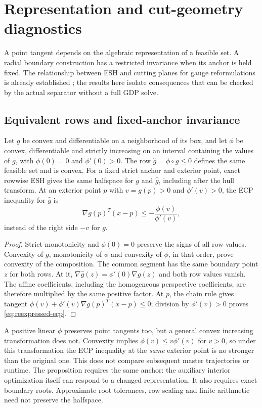\section{Representation and cut-geometry diagnostics}\label{sec:oracle}
A point tangent depends on the algebraic representation of a feasible set. A radial boundary construction has a restricted invariance when its anchor is held fixed. The relationship between ESH and cutting planes for gauge reformulations is already established \citep{serrano2020}; the results here isolate consequences that can be checked by the actual separator without a full GDP solve.

\subsection{Equivalent rows and fixed-anchor invariance}
\begin{proposition}\label{prop:invariance}
Let $g$ be convex and differentiable on a neighborhood of its box, and let $\phi$ be convex, differentiable and strictly increasing on an interval containing the values of $g$, with $\phi(0)=0$ and $\phi'(0)>0$. The row $\widehat g=\phi\circ g\le0$ defines the same feasible set and is convex. For a fixed strict anchor and exterior point, exact rowwise ESH gives the same halfspace for $g$ and $\widehat g$, including after the hull transform. At an exterior point $p$ with $v=g(p)>0$ and $\phi'(v)>0$, the ECP inequality for $\widehat g$ is
\begin{equation}\label{eq:reexpressed-ecp}
 \nabla g(p)^T(x-p)\le-\frac{\phi(v)}{\phi'(v)},
\end{equation}
instead of the right side $-v$ for $g$.
\end{proposition}
\begin{proof}
Strict monotonicity and $\phi(0)=0$ preserve the signs of all row values. Convexity of $g$, monotonicity of $\phi$ and convexity of $\phi$, in that order, prove convexity of the composition. The common segment has the same boundary point $z$ for both rows. At it, $\nabla\widehat g(z)=\phi'(0)\nabla g(z)$ and both row values vanish. The affine coefficients, including the homogeneous perspective coefficients, are therefore multiplied by the same positive factor. At $p$, the chain rule gives tangent
$\phi(v)+\phi'(v)\nabla g(p)^T(x-p)\le0$; division by $\phi'(v)>0$ proves \eqref{eq:reexpressed-ecp}.
\end{proof}
A positive linear $\phi$ preserves point tangents too, but a general convex increasing transformation does not. Convexity implies $\phi(v)\le v\phi'(v)$ for $v>0$, so under this transformation the ECP inequality at the \emph{same} exterior point is no stronger than the original one. This does not compare subsequent master trajectories or runtime. The proposition requires the same anchor: the auxiliary interior optimization itself can respond to a changed representation. It also requires exact boundary roots. Approximate root tolerances, row scaling and finite arithmetic need not preserve the halfspace.

